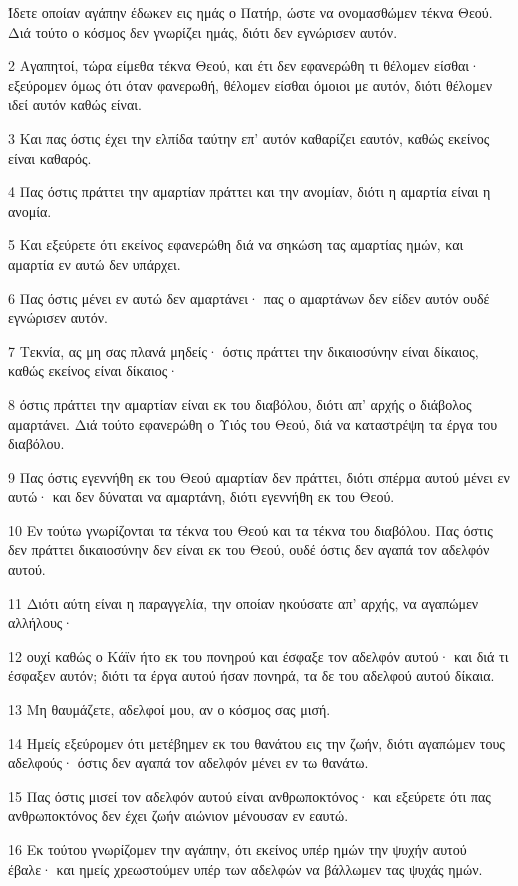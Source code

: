 \par Ίδετε οποίαν αγάπην έδωκεν εις ημάς ο Πατήρ, ώστε να ονομασθώμεν τέκνα Θεού. Διά τούτο ο κόσμος δεν γνωρίζει ημάς, διότι δεν εγνώρισεν αυτόν.
\par 2 Αγαπητοί, τώρα είμεθα τέκνα Θεού, και έτι δεν εφανερώθη τι θέλομεν είσθαι· εξεύρομεν όμως ότι όταν φανερωθή, θέλομεν είσθαι όμοιοι με αυτόν, διότι θέλομεν ιδεί αυτόν καθώς είναι.
\par 3 Και πας όστις έχει την ελπίδα ταύτην επ' αυτόν καθαρίζει εαυτόν, καθώς εκείνος είναι καθαρός.
\par 4 Πας όστις πράττει την αμαρτίαν πράττει και την ανομίαν, διότι η αμαρτία είναι η ανομία.
\par 5 Και εξεύρετε ότι εκείνος εφανερώθη διά να σηκώση τας αμαρτίας ημών, και αμαρτία εν αυτώ δεν υπάρχει.
\par 6 Πας όστις μένει εν αυτώ δεν αμαρτάνει· πας ο αμαρτάνων δεν είδεν αυτόν ουδέ εγνώρισεν αυτόν.
\par 7 Τεκνία, ας μη σας πλανά μηδείς· όστις πράττει την δικαιοσύνην είναι δίκαιος, καθώς εκείνος είναι δίκαιος·
\par 8 όστις πράττει την αμαρτίαν είναι εκ του διαβόλου, διότι απ' αρχής ο διάβολος αμαρτάνει. Διά τούτο εφανερώθη ο Υιός του Θεού, διά να καταστρέψη τα έργα του διαβόλου.
\par 9 Πας όστις εγεννήθη εκ του Θεού αμαρτίαν δεν πράττει, διότι σπέρμα αυτού μένει εν αυτώ· και δεν δύναται να αμαρτάνη, διότι εγεννήθη εκ του Θεού.
\par 10 Εν τούτω γνωρίζονται τα τέκνα του Θεού και τα τέκνα του διαβόλου. Πας όστις δεν πράττει δικαιοσύνην δεν είναι εκ του Θεού, ουδέ όστις δεν αγαπά τον αδελφόν αυτού.
\par 11 Διότι αύτη είναι η παραγγελία, την οποίαν ηκούσατε απ' αρχής, να αγαπώμεν αλλήλους·
\par 12 ουχί καθώς ο Κάϊν ήτο εκ του πονηρού και έσφαξε τον αδελφόν αυτού· και διά τι έσφαξεν αυτόν; διότι τα έργα αυτού ήσαν πονηρά, τα δε του αδελφού αυτού δίκαια.
\par 13 Μη θαυμάζετε, αδελφοί μου, αν ο κόσμος σας μισή.
\par 14 Ημείς εξεύρομεν ότι μετέβημεν εκ του θανάτου εις την ζωήν, διότι αγαπώμεν τους αδελφούς· όστις δεν αγαπά τον αδελφόν μένει εν τω θανάτω.
\par 15 Πας όστις μισεί τον αδελφόν αυτού είναι ανθρωποκτόνος· και εξεύρετε ότι πας ανθρωποκτόνος δεν έχει ζωήν αιώνιον μένουσαν εν εαυτώ.
\par 16 Εκ τούτου γνωρίζομεν την αγάπην, ότι εκείνος υπέρ ημών την ψυχήν αυτού έβαλε· και ημείς χρεωστούμεν υπέρ των αδελφών να βάλλωμεν τας ψυχάς ημών.
